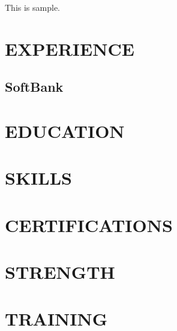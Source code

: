 \documentclass[10pt, a4paper]{article}
\begin{document}
This is sample.
\section{EXPERIENCE}
\subsection{SoftBank}
\section{EDUCATION}
\section{SKILLS}
\section{CERTIFICATIONS}
\section{STRENGTH}
\section{TRAINING}
\end{document}
